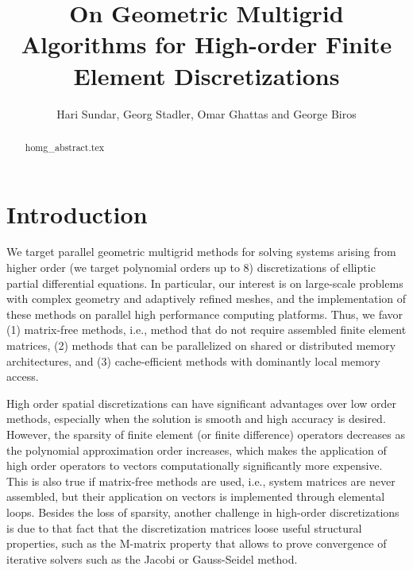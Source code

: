 \documentclass[times]{nlaauth}
\begin{document}

\title{On Geometric Multigrid Algorithms for High-order Finite Element Discretizations}

\author{Hari Sundar\corrauth, Georg Stadler, Omar Ghattas and George Biros}

\address{Institute for Computational Engineering \& Sciences, University of Texas, Austin, TX 78712}


\begin{abstract}
 {homg_abstract.tex}
\end{abstract}


\maketitle


\section{Introduction}


We target parallel geometric multigrid methods for solving systems
arising from higher order (we target polynomial orders up to 8)
discretizations of elliptic partial differential equations. In
particular, our interest is on large-scale problems with complex
geometry and adaptively refined meshes, and the implementation of
these methods on parallel high performance computing platforms. Thus,
we favor (1) matrix-free methods, i.e., method that do not require
assembled finite element matrices, (2) methods that can be
parallelized on shared or distributed memory architectures, and (3)
cache-efficient methods with dominantly local memory access.

High order spatial discretizations can have significant advantages
over low order methods, especially when the solution is smooth and
high accuracy is desired. However, the sparsity of finite element (or
finite difference) operators decreases as the polynomial approximation
order increases, which makes the application of high order operators
to vectors computationally significantly more expensive. This is also
true if matrix-free methods are used, i.e., system matrices are never
assembled, but their application on vectors is implemented through
elemental loops.  Besides the loss of sparsity, another challenge in
high-order discretizations is due to that fact that the discretization
matrices loose useful structural properties, such as the M-matrix
property that allows to prove convergence of iterative solvers such as
the Jacobi or Gauss-Seidel method.
\end{document}
